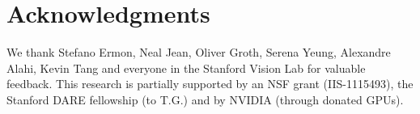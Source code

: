 \documentclass[letterpaper]{article}
\begin{document}
\section{Acknowledgments}
We thank Stefano Ermon, Neal Jean, Oliver Groth, Serena Yeung, Alexandre Alahi, Kevin Tang and everyone in the Stanford Vision Lab for valuable feedback. This research is partially supported by an NSF grant (IIS-1115493), the Stanford DARE fellowship (to T.G.) and by NVIDIA (through donated GPUs).

 

\end{document}
